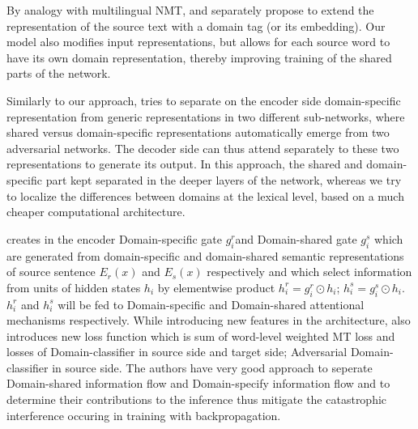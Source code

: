 \documentclass[11pt,a4paper]{article}
\newcommand{\fyTodo}[1]{\Todo[FY:]{\textcolor{orange}{#1}}}
\begin{document}
By analogy with multilingual NMT, \citet{Kobus17domaincontrol} and \citet{Chu18multilingual} separately propose to extend the representation of the source text with a domain tag (or its embedding). Our model also modifies input representations, but allows for each source word to have its own domain representation, thereby improving training of the shared parts of the network.\fyTodo{Talk about target embeddings somewhere.} 

Similarly to our approach, \cite{Zeng18multidomain} tries to separate on the encoder side domain-specific representation from generic representations in two different sub-networks, where shared versus domain-specific representations automatically emerge from two adversarial networks. The decoder side can thus attend separately to these two representations to generate its output. In this approach, the shared and domain-specific part kept separated in the deeper layers of the network, whereas we try to localize the differences between domains at the lexical level, based on a much cheaper computational architecture.

creates in the encoder Domain-specific gate $g^r_i$and Domain-shared gate $g^s_i$ which are generated from domain-specific and domain-shared semantic representations of source sentence $E_r(x)$ and $E_s(x)$ respectively and which select information from units of hidden states $h_i$ by elementwise product $h^r_i = g^r_i \odot h_i$; $h^s_i = g^s_i \odot h_i$. $h^r_i$ and $h^s_i$ will be fed to Domain-specific and Domain-shared attentional mechanisms respectively. While introducing new features in the architecture, \cite{Zeng18multidomain} also introduces new loss function which is sum of word-level weighted MT loss and losses of Domain-classifier in source side and target side; Adversarial Domain-classifier in source side. The authors have very good approach to seperate Domain-shared information flow and Domain-specify information flow and to determine their contributions to the inference thus mitigate the catastrophic interference occuring in training with backpropagation.
\end{document}
